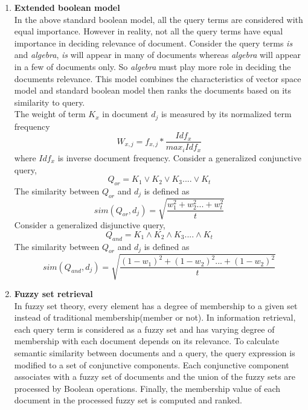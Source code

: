 \begin{enumerate}
\item{\textbf{Extended boolean model}}\\
In the above standard boolean model, all the query terms are considered with equal importance. However in reality, not all the query terms have equal importance in deciding relevance of document. Consider the query terms \textit{is} and \textit{algebra}, \textit{is} will appear in many of documents whereas \textit{algebra} will appear in a few of documents only. So \textit{algebra} must play more role in deciding the documents relevance. This model combines the characteristics of vector space model and standard boolean model then ranks the documents based on its similarity to query.\\
The weight of term $K_{x}$ in document $d_{j}$ is measured by its normalized term frequency
\begin{equation}
W_{x,j} =  f_{x,j} * \frac{Idf_{x}}{max_{i} Idf_{x}}
\end{equation}
where $Idf_{x}$ is inverse document frequency.
Consider a generalized conjunctive query,
\begin{equation}
Q_{or} = K_{1} \vee K_{2} \vee K_{3} .... \vee K_{t}
\end{equation}
The similarity between $Q_{or}$ and $d_{j}$ is defined as 
\begin{equation}
sim(Q_{or}, d_{j}) = \sqrt{\frac{w_{1}^{2} + w_{2}^{2} ...+w_{t}^{2}} {t}}
\end{equation}
Consider a generalized disjunctive query, 
\begin{equation}
Q_{and} = K_{1} \wedge K_{2}  \wedge  K_{3} ....  \wedge  K_{t} 
\end{equation}
The similarity between $Q_{or}$ and $d_{j}$ is defined as 
\begin{equation}
sim(Q_{and}, d_{j}) = \sqrt{\frac{(1-w_{1})^{2} + (1-w_{2})^{2} ...+(1-w_{2})^{2}} {t}}
\end{equation}

\item{\textbf{Fuzzy set retrieval}}\\
In fuzzy set theory, every element has a degree of membership to a given set instead of traditional membership(member or not). In information retrieval, each query term is considered as a fuzzy set and has varying degree of membership with each document depends on its relevance. To calculate semantic similarity between documents and a query, the query expression is modified to a set of conjunctive components. Each conjunctive component associates with a fuzzy set of documents and the union of the fuzzy sets are processed by Boolean operations. Finally, the membership value of each document in the processed fuzzy set is computed and ranked.

\end{enumerate}

